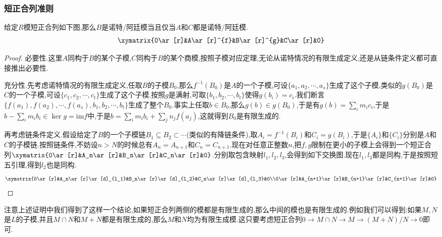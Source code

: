\subsubsection{短正合列准则}

给定$R$模短正合列如下图,那么$B$是诺特/阿廷模当且仅当$A$和$C$都是诺特/阿廷模.
$$\xymatrix{0\ar[r]&A\ar[r]^{f}&B\ar[r]^{g}&C\ar[r]&0}$$
\begin{proof}

必要性.这里$A$同构于$B$的某个子模,$C$同构于$B$的某个商模,按照子模对应定理,无论从诺特情况的有限生成定义,还是从链条件定义都可直接推出必要性.

充分性.先考虑诺特情况的有限生成定义,任取$B$的子模$B_0$,那么$f^{-1}(B_0)$是$A$的一个子模,可设$\{a_1,a_2,\cdots,a_s\}$生成了这个子模,类似的$g(B_0)$是$C$的一个子模,可设$\{c_1,c_2,\cdots,c_t\}$生成了这个子模.按照$g$是满射,可取$\{b_1,b_2,\cdots,b_t\}$使得$g(b_i)=c_i$.我们断言$\{f(a_1),f(a_2),\cdots,f(a_s),b_1,b_2,\cdots,b_t\}$生成了整个$B_0$.事实上任取$b\in B_0$,那么$g(b)\in g(B_0)$,于是有$g(b)=\sum_im_ic_i$,于是$b-\sum_im_ib_i\in\ker g=\mathrm{im}f$中,于是$b=\sum_im_ib_i+\sum_jn_jf(a_j)$,这就得到$B_0$是有限生成的.

再考虑链条件定义.假设给定了$B$的一个子模链$B_1\subseteq B_2\subset\cdots$(类似的有降链条件),取$A_i=f^{-1}(B_i)$和$C_i=g(B_i)$,于是$\{A_i\}$和$\{C_i\}$分别是$A$和$C$的子模链.按照链条件,不妨设$n>N$的时候总有$A_n=A_{n+1}$和$C_n=C_{n+1}$.现在对任意正整数$n$,把$f,g$限制在更小的子模上会得到一个短正合列$\xymatrix{0\ar[r]&A_n\ar[r]&B_n\ar[r]&C_n\ar[r]&0}$.分别取包含映射$l_1,l_2,l_3$,会得到如下交换图.现在$l_1,l_3$都是同构,于是按照短五引理,得到$l_2$也是同构.
$$\xymatrix{0\ar[r]&A_n\ar[r]\ar[d]_{l_1}&B_n\ar[r]\ar[d]_{l_2}&C_n\ar[r]\ar[d]_{l_3}&0\\0\ar[r]&A_{n+1}\ar[r]&B_{n+1}\ar[r]&C_{n+1}\ar[r]&0}$$
\end{proof}

注意上述证明中我们得到了这样一个结论,如果短正合列两侧的模都是有限生成的,那么中间的模也是有限生成的.例如我们可以得到:如果$M,N$是$L$的子模,并且$M\cap N$和$M+N$都是有限生成的,那么$M$和$N$均为有限生成模.这只要考虑短正合列$0\to M\cap N\to M\to(M+N)/N\to0$即可.

